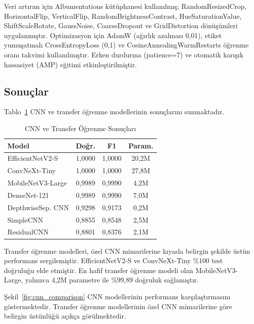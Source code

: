 \documentclass[conference]{IEEEtran}
\begin{document}
Veri art{\i}r{\i}m i\c{c}in Albumentations k\"{u}t\"{u}phanesi kullan{\i}lm{\i}\c{s}; RandomResizedCrop, HorizontalFlip, VerticalFlip, RandomBrightnessContrast, HueSaturationValue, ShiftScaleRotate, GaussNoise, CoarseDropout ve GridDistortion d\"{o}n\"{u}\c{s}\"{u}mleri uygulanm{\i}\c{s}t{\i}r. Optimizasyon i\c{c}in AdamW \cite{loshchilov2017adamw} (a\u{g}{\i}rl{\i}k azalmas{\i} 0,01), etiket yumu\c{s}atmal{\i} CrossEntropyLoss (0,1) ve CosineAnnealingWarmRestarts \"{o}\u{g}renme oran{\i} takvimi kullan{\i}lm{\i}\c{s}t{\i}r. Erken durdurma (patience=7) ve otomatik kar{\i}\c{s}{\i}k hassasiyet (AMP) e\u{g}itimi etkinle\c{s}tirilmi\c{s}tir.

\subsection{Sonu\c{c}lar}
Tablo~\ref{tab:cnn} CNN ve transfer \"{o}\u{g}renme modellerinin sonu\c{c}lar{\i}n{\i} sunmaktad{\i}r.

\begin{table}[htbp]
\centering
\caption{CNN ve Transfer \"{O}\u{g}renme Sonu\c{c}lar{\i}}
\label{tab:cnn}
\renewcommand{\arraystretch}{1.15}
\begin{tabular}{lccc}
\toprule
\textbf{Model} & \textbf{Do\u{g}r.} & \textbf{F1} & \textbf{Param.} \\
\midrule
EfficientNetV2-S   & 1,0000 & 1,0000 & 20,2M \\
ConvNeXt-Tiny      & 1,0000 & 1,0000 & 27,8M \\
MobileNetV3-Large  & 0,9989 & 0,9990 & 4,2M  \\
DenseNet-121       & 0,9989 & 0,9990 & 7,0M  \\
DepthwiseSep. CNN  & 0,9298 & 0,9173 & 0,2M  \\
SimpleCNN          & 0,8855 & 0,8548 & 2,5M  \\
ResidualCNN        & 0,8801 & 0,8376 & 2,1M  \\
\bottomrule
\end{tabular}
\end{table}

Transfer \"{o}\u{g}renme modelleri, \"{o}zel CNN mimarilerine k{\i}yasla belirgin \c{s}ekilde \"{u}st\"{u}n performans sergilemi\c{s}tir. EfficientNetV2-S ve ConvNeXt-Tiny \%100 test do\u{g}rulu\u{g}u elde etmi\c{s}tir. En hafif transfer \"{o}\u{g}renme modeli olan MobileNetV3-Large, yaln{\i}zca 4,2M parametre ile \%99,89 do\u{g}ruluk sa\u{g}lam{\i}\c{s}t{\i}r.

\c{S}ekil~\ref{fig:cnn_comparison} CNN modellerinin performans kar\c{s}{\i}la\c{s}t{\i}rmas{\i}n{\i} g\"{o}stermektedir. Transfer \"{o}\u{g}renme modellerinin \"{o}zel CNN mimarilerine g\"{o}re belirgin \"{u}st\"{u}nl\"{u}\u{g}\"{u} a\c{c}{\i}k\c{c}a g\"{o}r\"{u}lmektedir.
\end{document}
